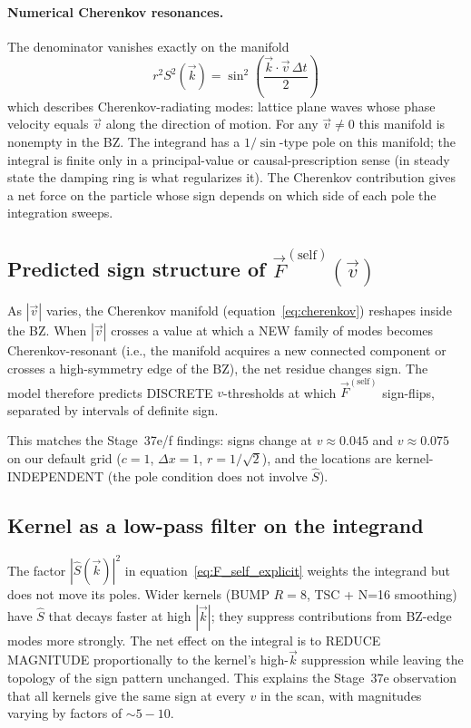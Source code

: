 \documentclass[11pt,a4paper]{article}
\begin{document}
\paragraph{Numerical Cherenkov resonances.}
The denominator vanishes exactly on the manifold
\begin{equation}
r^2 S^2(\vec k) = \sin^2\!\left(\frac{\vec k\cdot \vec v\, \Delta t}{2}\right)
\label{eq:cherenkov}
\end{equation}
which describes Cherenkov-radiating modes: lattice plane waves whose phase velocity equals $\vec v$ along the direction of motion.  For any $\vec v \neq 0$ this manifold is nonempty in the BZ.  The integrand has a $1/\!\sin$-type pole on this manifold; the integral is finite only in a principal-value or causal-prescription sense (in steady state the damping ring is what regularizes it).  The Cherenkov contribution gives a net force on the particle whose sign depends on which side of each pole the integration sweeps.

\subsection{Predicted sign structure of $\vec F^{(\mathrm{self})}(\vec v)$}

As $|\vec v|$ varies, the Cherenkov manifold (equation~\ref{eq:cherenkov}) reshapes inside the BZ.  When $|\vec v|$ crosses a value at which a NEW family of modes becomes Cherenkov-resonant (i.e., the manifold acquires a new connected component or crosses a high-symmetry edge of the BZ), the net residue changes sign.  The model therefore predicts DISCRETE $v$-thresholds at which $\vec F^{(\mathrm{self})}$ sign-flips, separated by intervals of definite sign.

This matches the Stage~37e/f findings: signs change at $v\approx 0.045$ and $v\approx 0.075$ on our default grid ($c=1$, $\Delta x = 1$, $r = 1/\sqrt 2$), and the locations are kernel-INDEPENDENT (the pole condition does not involve $\hat S$).

\subsection{Kernel as a low-pass filter on the integrand}

The factor $|\hat S(\vec k)|^2$ in equation~\ref{eq:F_self_explicit} weights the integrand but does not move its poles.  Wider kernels (BUMP $R=8$, TSC + N=16 smoothing) have $\hat S$ that decays faster at high $|\vec k|$; they suppress contributions from BZ-edge modes more strongly.  The net effect on the integral is to REDUCE MAGNITUDE proportionally to the kernel's high-$\vec k$ suppression while leaving the topology of the sign pattern unchanged.  This explains the Stage~37e observation that all kernels give the same sign at every $v$ in the scan, with magnitudes varying by factors of $\sim 5{-}10$.
\end{document}
